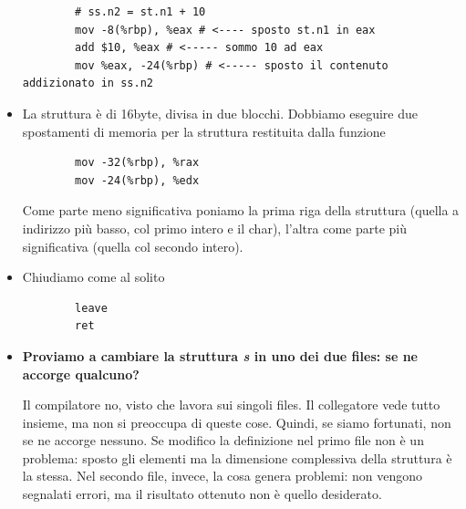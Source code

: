 \begin{itemize}
\begin{verbatim}
		# ss.n2 = st.n1 + 10
		mov -8(%rbp), %eax # <---- sposto st.n1 in eax
		add $10, %eax # <----- sommo 10 ad eax
		mov %eax, -24(%rbp) # <----- sposto il contenuto addizionato in ss.n2
	\end{verbatim}
	\item La struttura è di 16byte, divisa in due blocchi. Dobbiamo eseguire due spostamenti di memoria per la struttura restituita dalla funzione 
	\begin{verbatim}
		mov -32(%rbp), %rax
		mov -24(%rbp), %edx
	\end{verbatim}
	Come parte meno significativa poniamo la prima riga della struttura (quella a indirizzo più basso, col primo intero e il char), l'altra come parte più significativa (quella col secondo intero).
	\item Chiudiamo come al solito
	\begin{verbatim}
		leave
		ret
	\end{verbatim}
	\item \textbf{Proviamo a cambiare la struttura \emph{s} in uno dei due files: se ne accorge qualcuno?}
	
	Il compilatore no, visto che lavora sui singoli files. Il collegatore vede tutto insieme, ma non si preoccupa di queste cose. Quindi, se siamo fortunati, non se ne accorge nessuno. Se modifico la definizione nel primo file non è un problema: sposto gli elementi ma la dimensione complessiva della struttura è la stessa. Nel secondo file, invece, la cosa genera problemi: non vengono segnalati errori, ma il risultato ottenuto non è quello desiderato.
\end{itemize}
